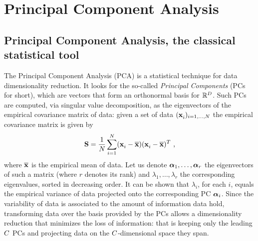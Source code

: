 \section{Principal Component Analysis}
%
%
\subsection{Principal Component Analysis, the classical statistical tool}
The Principal Component Analysis (PCA) is a statistical technique for data dimensionality reduction. It looks for the so-called {\em Principal Components} (PCs for short), which are vectors that form an orthonormal 	basis for $\mathbb{R}^\traceLength$. Such PCs are computed, via singular value decomposition, as the eigenvectors of the empirical covariance matrix of data: given a set of data $(\sss[]{i})_{i=1,\dots,\numTraces[]}$ the empirical covariance matrix is given by
\begin{equation}\label{eq:covmat}
\covmat = \frac{1}{\numTraces[]} \sum_{i=1}^{\numTraces[]}(\sss[]{i} - \mmmX)(\sss[]{i} - \mmmX)^T \mbox{ ,}
\end{equation}
 where $\mmmX$ is the empirical mean of data. Let us denote $\AAlpha_1, \dots, \AAlpha_r$ the eigenvectors of such a matrix (where $r$ denotes its rank) and $\lambda_1, \dots, \lambda_r$  the corresponding eigenvalues, sorted in decreasing order. It can be shown that $\lambda_i$, for each $i$, equals the empirical variance of data projected onto the corresponding PC $\AAlpha_i$. Since the variability of data is associated to the amount of information data hold, transforming data over the basis provided by the PCs allows a dimensionality reduction that minimizes the loss of information: that is keeping only the leading $\newTraceLength$ PCs and projecting data on the $\newTraceLength$-dimensional space they span.\\

